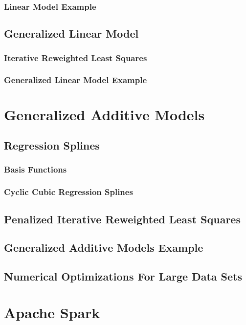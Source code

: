 \documentclass{article}
\begin{document}
        \subsubsection{Linear Model Example }
        \subsection{Generalized Linear Model}
        \subsubsection{Iterative Reweighted Least Squares}
        \subsubsection{Generalized Linear Model Example}
    
    \section{Generalized Additive Models}
        \subsection{Regression Splines}
            \subsubsection{Basis Functions}
            \subsubsection{Cyclic Cubic Regression Splines}
        \subsection{Penalized Iterative Reweighted Least Squares}
        \subsection{Generalized Additive Models Example}
        \subsection{Numerical Optimizations For Large Data Sets}
    
    \section{Apache Spark}
\end{document}
